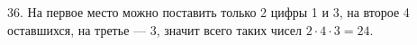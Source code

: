 36. На первое место можно поставить только 2 цифры 1 и 3, на второе 4 оставшихся, на третье --- 3, значит всего таких чисел $2\cdot4\cdot3=24.$\\
